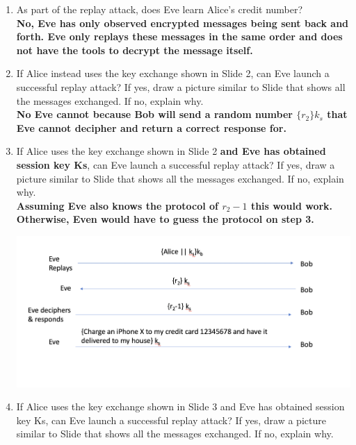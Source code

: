 \documentclass[12pt]{article}
\begin{document}
\begin{enumerate}
\begin{enumerate}
  \item As part of the replay attack, does Eve learn Alice's credit number? \\

  \textbf{No, Eve has only observed encrypted messages being sent back and forth. Eve only replays these messages in the same order and does not have the tools to decrypt the message itself.} \\

  \item If Alice instead uses the key exchange shown in Slide 2, can Eve launch a successful replay attack? If yes, draw a picture similar to Slide that shows all the messages exchanged. If no, explain why. \\

  \textbf{No Eve cannot because Bob will send a random number $\{r_2\}k_s$ that Eve cannot decipher and return a correct response for.} \\

  \item If Alice uses the key exchange shown in Slide 2 \textbf{and Eve has obtained session key Ks}, can Eve launch a successful replay attack? If yes, draw a picture similar to Slide that shows all the messages exchanged. If no, explain why.  \\

  \textbf{Assuming Eve also knows the protocol of $r_2 - 1$ this would work. Otherwise, Even would have to guess the protocol on step 3. }
\begin{center}
  \includegraphics[scale=0.4]{prob1part2.png} \\
\end{center}

  \item If Alice uses the key exchange shown in Slide 3 and Eve has obtained session key Ks, can Eve launch a successful replay attack? If yes, draw a picture similar to Slide that shows all the messages exchanged. If no, explain why. \\


\end{enumerate}
\end{enumerate}
\end{document}

